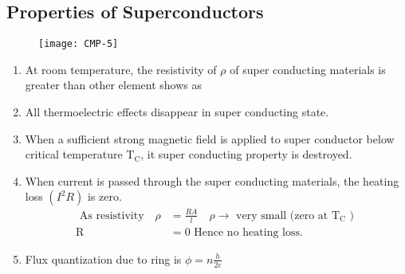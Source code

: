 \subsection{Properties of Superconductors}
\begin{figure}[H]
	\centering
	\texttt{[image: CMP-5]}
	\caption{}
	\label{}
\end{figure}
\begin{enumerate}
	\item At room temperature, the resistivity of $\rho$ of super conducting materials is greater than other element shows as
	\item All thermoelectric effects disappear in super conducting state.
	\item  When a sufficient strong magnetic field is applied to super conductor below critical temperature $\mathrm{T}_{\mathrm{C}}$, it super conducting property is destroyed.
	\item When current is passed through the super conducting materials, the heating loss $\left(I^{2} R\right)$ is zero.
	\begin{align*}
		\text{	As resistivity}\quad \rho&=\frac{R A}{l} \quad \rho \rightarrow \text { very small (zero at } \mathrm{T}_{\mathrm{C}} \text { ) }\\
		\mathrm{R}&=0 \text { Hence no heating loss. }
	\end{align*}
	\item Flux quantization due to ring is $\phi=n \frac{h}{2 e}$
\end{enumerate}
